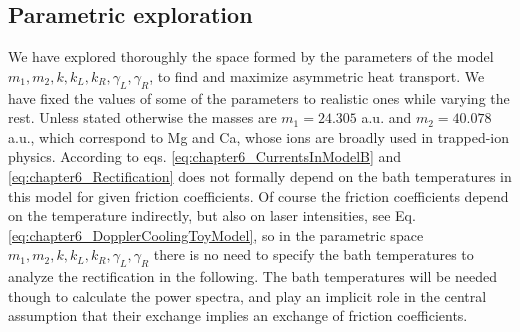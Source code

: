 \subsection{Parametric exploration}
%
%
%
We have explored thoroughly the space formed by the parameters of the model $m_1,m_2,k,k_L,k_R,\gamma_L,\gamma_R$, to find
and maximize asymmetric heat transport. We have fixed the values of some of the parameters to realistic ones while varying the rest. Unless stated otherwise the masses are
$m_1 = 24.305$ a.u. and $m_2 = 40.078$ a.u., which correspond to Mg and Ca, whose ions are broadly used in trapped-ion physics. According to eqs. \eqref{eq:chapter6_CurrentsInModelB} and \eqref{eq:chapter6_Rectification} does not formally depend on the bath temperatures in this model for given friction coefficients. Of course the friction coefficients depend on the temperature indirectly, but also on laser intensities, see Eq. \eqref{eq:chapter6_DopplerCoolingToyModel}, so in the parametric space $m_1,m_2,k,k_L,k_R,\gamma_L,\gamma_R$ there is no need to specify the bath temperatures to analyze the rectification in the following. The bath temperatures will be needed though to calculate the power spectra, and play an implicit role in the central assumption that their exchange implies an exchange of friction coefficients.

